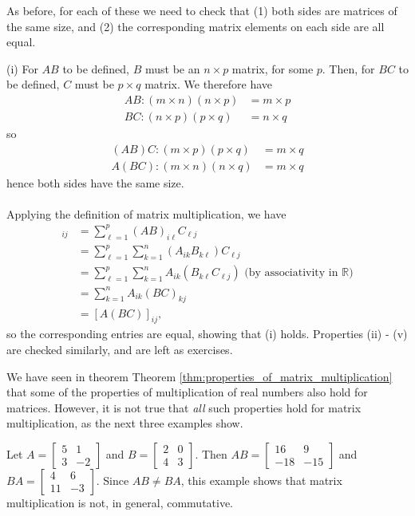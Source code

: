 \documentclass[12pt,letterpaper,reqno]{article}
\numberwithin{equation}{section}
\newcommand{\ti}[1]{\textit{#1}}
\begin{document}
\begin{pf}
As before, for each of these we need to check that (1) both sides are matrices of the same size, and (2) the corresponding matrix elements on each side are all equal. 

(i) For $AB$ to be defined, $B$ must be an $n \times p$ matrix, for some $p$. Then, for $BC$ to be defined, $C$ must be $p \times q$ matrix. We therefore have 
\begin{align*}
	AB: (m \times n)(n \times p)&=m \times p \\
	BC: (n \times p)(p \times q)&=n \times q
\end{align*}
so
\begin{align*}
	(AB)C: (m \times p)(p \times q)&=m \times q \\
	A(BC): (m \times n)(n \times q)&=m \times q
\end{align*}
hence both sides have the same size. \\
\\

Applying the definition of matrix multiplication, we have
\begin{align*}
	[(AB)C]_{ij}&=\sum_{\ell=1}^p(AB)_{i\ell}C_{\ell j} \\
	&=\sum_{\ell=1}^p\sum_{k=1}^n (A_{ik}B_{k\ell})C_{\ell j} \\
	&=\sum_{\ell=1}^p\sum_{k=1}^n A_{ik}(B_{k\ell}C_{\ell j}) \text{ (by associativity in $\mathbb{R}$)}\\
	&=\sum_{k=1}^nA_{ik}(BC)_{kj} \\
	&=[A(BC)]_{ij},
\end{align*}
so the corresponding entries are equal, showing that (i) holds. Properties (ii) - (v) are checked similarly, and are left as exercises.	
\end{pf}

We have seen in theorem Theorem \ref{thm:properties_of_matrix_multiplication} that some of the properties of multiplication of real numbers also hold for matrices. However, it is not true that \ti{all} such properties hold for matrix multiplication, as the next three examples show.

\begin{example} 
	Let $A=\begin{bmatrix}
		5&1\\3&-2
	\end{bmatrix}$ and $B=\begin{bmatrix}
		2&0 \\ 4&3
	\end{bmatrix}$. Then $AB=\begin{bmatrix}
	16 & 9 \\ -18 & -15
\end{bmatrix}$ and  $BA=\begin{bmatrix}
	4 & 6 \\ 11 & -3
\end{bmatrix}$. Since $AB \neq BA$, this example shows that matrix multiplication is not, in general, commutative.
\end{example}
\end{document}
